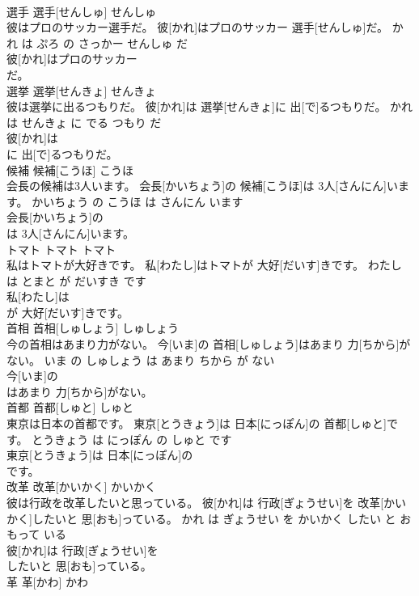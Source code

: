 \documentclass[8pt]{extreport}
\begin{document}
\begin{CJK}{UTF8}{min}
\\	選手	選手[せんしゅ]	せんしゅ	
\\	彼はプロのサッカー選手だ。	彼[かれ]はプロのサッカー 選手[せんしゅ]だ。	かれ は ぷろ の さっかー せんしゅ だ	
\\	彼[かれ]はプロのサッカー
\\	だ。			
\\	選挙	選挙[せんきょ]	せんきょ	
\\	彼は選挙に出るつもりだ。	彼[かれ]は 選挙[せんきょ]に 出[で]るつもりだ。	かれ は せんきょ に でる つもり だ	
\\	彼[かれ]は
\\	に 出[で]るつもりだ。			
\\	候補	候補[こうほ]	こうほ	
\\	会長の候補は3人います。	会長[かいちょう]の 候補[こうほ]は 3人[さんにん]います。	かいちょう の こうほ は さんにん います	
\\	会長[かいちょう]の
\\	は 3人[さんにん]います。			
\\	トマト	トマト	トマト	
\\	私はトマトが大好きです。	私[わたし]はトマトが 大好[だいす]きです。	わたし は とまと が だいすき です	
\\	私[わたし]は
\\	が 大好[だいす]きです。			
\\	首相	首相[しゅしょう]	しゅしょう	
\\	今の首相はあまり力がない。	今[いま]の 首相[しゅしょう]はあまり 力[ちから]がない。	いま の しゅしょう は あまり ちから が ない	
\\	今[いま]の
\\	はあまり 力[ちから]がない。			
\\	首都	首都[しゅと]	しゅと	
\\	東京は日本の首都です。	東京[とうきょう]は 日本[にっぽん]の 首都[しゅと]です。	とうきょう は にっぽん の しゅと です	
\\	東京[とうきょう]は 日本[にっぽん]の
\\	です。			
\\	改革	改革[かいかく]	かいかく	
\\	彼は行政を改革したいと思っている。	彼[かれ]は 行政[ぎょうせい]を 改革[かいかく]したいと 思[おも]っている。	かれ は ぎょうせい を かいかく したい と おもって いる	
\\	彼[かれ]は 行政[ぎょうせい]を
\\	したいと 思[おも]っている。			
\\	革	革[かわ]	かわ	

\end{CJK}
\end{document}
